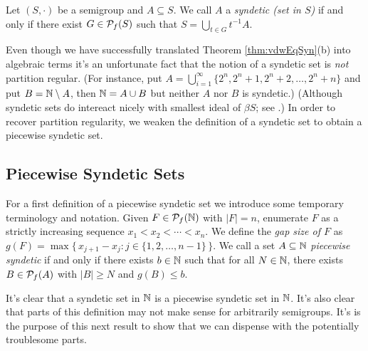 \begin{defn}
  Let $(S, \cdot)$ be a semigroup and $A \subseteq S$.
  We call $A$ a \emph{syndetic (set in $S$)} if and only if there exist $G \in \mathcal{P}_f(S)$ such that $S = \bigcup_{t \in G} t^{-1}A$. 
\end{defn}

Even though we have successfully translated Theorem \ref{thm:vdwEqSyn}(b) into algebraic terms it's an unfortunate fact that the notion of a syndetic set is \emph{not} partition regular. 
(For instance, put $A = \bigcup_{i=1}^\infty \{2^n, 2^n+1, 2^n+2, \ldots, 2^n+n\}$ and put $B = \mathbb{N} \setminus A$, then $\mathbb{N} = A \cup B$ but neither $A$ nor $B$ is syndetic.)
(Although syndetic sets do intereact nicely with smallest ideal of $\beta S$; see \cite[Theorems 4.39 and 4.43]{Hindman:1998fk}.)
In order to recover partition regularity, we weaken the definition of a syndetic set to obtain a piecewise syndetic set.

\subsection{Piecewise Syndetic Sets}
For a first definition of a piecewise syndetic set we introduce some temporary terminology and notation.
Given $F \in \mathcal{P}_f(\mathbb{N})$ with $|F| = n$, enumerate $F$ as a strictly increasing sequence $x_1 < x_2 < \cdots < x_n$. 
We define the \emph{gap size of $F$} as $g(F) = \max\bigr\{\, x_{j+1} - x_j : j \in \{1, 2, \ldots, n-1\} \,\bigl\}$.
We call a set $A \subseteq \mathbb{N}$ \emph{piecewise syndetic} if and only if there exists $b \in \mathbb{N}$ such that for all $N \in \mathbb{N}$, there exists $B \in \mathcal{P}_f(A)$ with $|B| \ge N$ and $g(B) \le b$.

It's clear that a syndetic set in $\mathbb{N}$ is a piecewise syndetic set in $\mathbb{N}$.
It's also clear that  parts of this definition may not make sense for arbitrarily semigroups.
It's is the purpose of this next result to show that we can dispense with the potentially troublesome parts.

